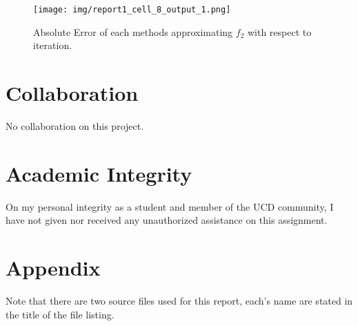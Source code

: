 \documentclass[a4paper,12pt]{article}
\begin{document}
\begin{figure}[H]
    \centering
     \texttt{[image: img/report1\_cell\_8\_output\_1.png]}
     \caption{Absolute Error of each methods approximating $f_2$ with respect to iteration.}
     \label{fig:3}   
\end{figure}





\section{Collaboration}
No collaboration on this project.


\section{Academic Integrity}
On my personal integrity as a student and member of the UCD community, I have not given nor received any unauthorized assistance on this assignment.


\section{Appendix}
Note that there are two source files used for this report,
each's name are stated in the title of the file listing.


\end{document}
